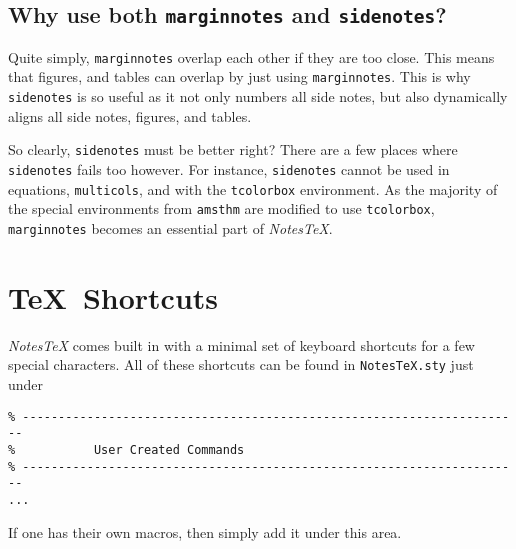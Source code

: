\subsection{Why use both \texttt{marginnotes} and \texttt{sidenotes}?}
Quite simply, \texttt{marginnotes} overlap each other if they are too close. This means that figures, and tables can overlap by just using \texttt{marginnotes}. This is why \texttt{sidenotes} is so useful as it not only numbers all side notes, but also dynamically aligns all side notes, figures, and tables.

So clearly, \texttt{sidenotes} must be better right? There are a few places where \texttt{sidenotes} fails too however. For instance, \texttt{sidenotes} cannot be used in equations, \texttt{multicols}, and with the \texttt{tcolorbox} environment. As the majority of the special environments from \texttt{amsthm} are modified to use \texttt{tcolorbox}, \texttt{marginnotes} becomes an essential part of \textit{NotesTeX}.

\newpage

\section{\TeX\ Shortcuts}\label{sec:shortcuts}
\textit{NotesTeX} comes built in with a minimal set of keyboard shortcuts for a few special characters. All of these shortcuts can be found in \texttt{NotesTeX.sty} just under
\begin{verbatim}
% ----------------------------------------------------------------------
%           User Created Commands
% ----------------------------------------------------------------------
...
\end{verbatim}
If one has their own macros, then simply add it under this area. 

